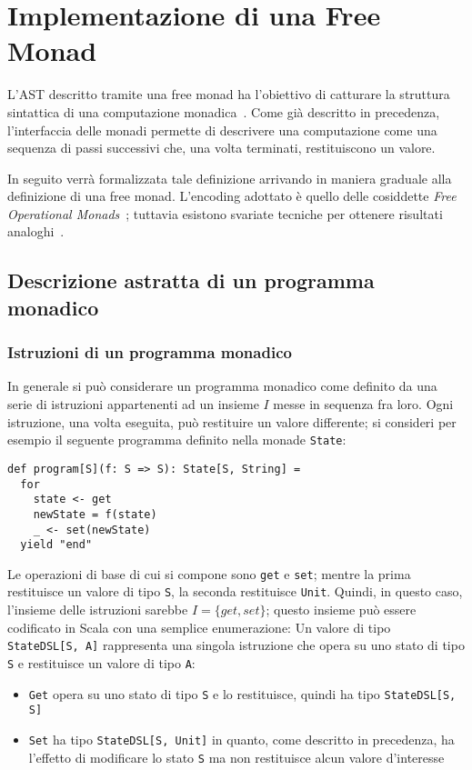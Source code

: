 \section{Implementazione di una Free Monad}

L'AST descritto tramite una free monad ha l'obiettivo di catturare la struttura sintattica di una computazione monadica~\cite{cit:programming-monads-operationally-with-unimo}.
Come già descritto in precedenza, l'interfaccia delle monadi permette di descrivere una computazione come una sequenza di passi successivi che, una volta terminati, restituiscono un valore.

In seguito verrà formalizzata tale definizione arrivando in maniera graduale alla definizione di una free monad.
L'encoding adottato è quello delle cosiddette \emph{Free Operational Monads}~\cite{cit:programming-monads-operationally-with-unimo}; tuttavia esistono svariate tecniche per ottenere risultati analoghi~\cite{cit:data-types-a-la-carte,cit:freer-monads-more-extensible-effects,cit:fusion-for-free}.

\subsection{Descrizione astratta di un programma monadico}
\subsubsection{Istruzioni di un programma monadico}
In generale si può considerare un programma monadico come definito da una serie di istruzioni appartenenti ad un insieme $I$ messe in sequenza fra loro.
Ogni istruzione, una volta eseguita, può restituire un valore differente; si consideri per esempio il seguente programma definito nella monade \lstinline{State}:
\begin{lstlisting}[language=scala3]
def program[S](f: S => S): State[S, String] =
  for
    state <- get
    newState = f(state)
    _ <- set(newState)
  yield "end"
\end{lstlisting}
Le operazioni di base di cui si compone sono \lstinline{get} e \lstinline{set}; mentre la prima restituisce un valore di tipo \lstinline{S}, la seconda restituisce \lstinline{Unit}.
Quindi, in questo caso, l'insieme delle istruzioni sarebbe $I = \{get, set\}$; questo insieme può essere codificato in Scala con una semplice enumerazione:
Un valore di tipo \lstinline{StateDSL[S, A]} rappresenta una singola istruzione che opera su uno stato di tipo \lstinline{S} e restituisce un valore di tipo \lstinline{A}:
\begin{itemize}
  \item \lstinline{Get} opera su uno stato di tipo \lstinline{S} e lo restituisce, quindi ha tipo \lstinline{StateDSL[S, S]}
  \item \lstinline{Set} ha tipo \lstinline{StateDSL[S, Unit]} in quanto, come descritto in precedenza, ha l'effetto di modificare lo stato \lstinline{S} ma non restituisce alcun valore d'interesse
\end{itemize}

